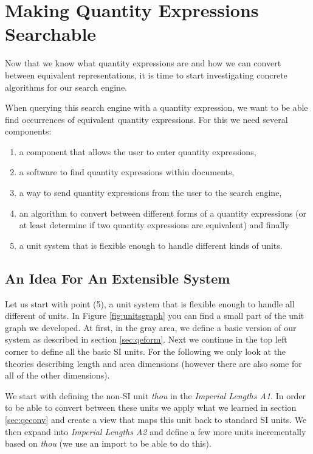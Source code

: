 \section{Making Quantity Expressions Searchable}
\label{sec:mqes}
Now that we know what quantity expressions are and how we can convert between equivalent representations, it is time to start investigating concrete algorithms for our search engine.

When querying this search engine with a quantity expression, we want to be able find occurrences of equivalent quantity expressions. For this we need several components:
\begin{enumerate}
  \item a component that allows the user to enter quantity expressions,
  \item a software to find quantity expressions within documents,
  \item a way to send quantity expressions from the user to the search engine,
  \item an algorithm to convert between different forms of a quantity expressions (or at least determine if two quantity expressions are equivalent) and finally
  \item a unit system that is flexible enough to handle different kinds of units.
\end{enumerate}

\subsection{An Idea For An Extensible System}
\label{sec:meq_model}

Let us start with point (5), a unit system that is flexible enough to handle all different of units. In Figure \ref{fig:unitsgraph} you can find a small part of the unit graph we developed. At first, in the gray area, we define a basic version of our system as described in section \ref{sec:qeform}. Next we continue in the top left corner to define all the basic SI units. For the following we only look at the theories describing length and area dimensions (however there are also some for all of the other dimensions).



We start with defining the non-SI unit \textit{thou} in the \textit{Imperial Lengths A1}. In order to be able to convert between these units we apply what we learned in section \ref{sec:qeconv} and create a view that maps this unit back to standard SI units. We then expand into \textit{Imperial Lengths A2} and define a few more units incrementally based on \textit{thou} (we use an import to be able to do this).


